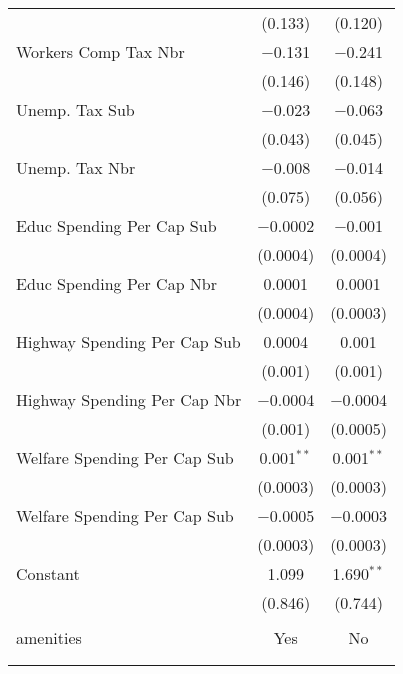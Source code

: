 \begin{table}[!htbp]
\begin{tabular}{@{\extracolsep{5pt}}lcc}
  & (0.133) & (0.120) \\ 
  Workers Comp Tax Nbr & $-$0.131 & $-$0.241 \\ 
  & (0.146) & (0.148) \\ 
  Unemp. Tax Sub & $-$0.023 & $-$0.063 \\ 
  & (0.043) & (0.045) \\ 
  Unemp. Tax Nbr & $-$0.008 & $-$0.014 \\ 
  & (0.075) & (0.056) \\ 
  Educ Spending Per Cap Sub & $-$0.0002 & $-$0.001 \\ 
  & (0.0004) & (0.0004) \\ 
  Educ Spending Per Cap Nbr & 0.0001 & 0.0001 \\ 
  & (0.0004) & (0.0003) \\ 
  Highway Spending Per Cap Sub & 0.0004 & 0.001 \\ 
  & (0.001) & (0.001) \\ 
  Highway Spending Per Cap Nbr & $-$0.0004 & $-$0.0004 \\ 
  & (0.001) & (0.0005) \\ 
  Welfare Spending Per Cap Sub & 0.001$^{**}$ & 0.001$^{**}$ \\ 
  & (0.0003) & (0.0003) \\ 
  Welfare Spending Per Cap Sub & $-$0.0005 & $-$0.0003 \\ 
  & (0.0003) & (0.0003) \\ 
  Constant & 1.099 & 1.690$^{**}$ \\ 
  & (0.846) & (0.744) \\ 
 \hline \\[-1.8ex] 
amenities & Yes & No \\ 
\hline \\[-1.8ex] 
\hline 
\hline \\[-1.8ex] 
\end{tabular} 
\end{table} 
